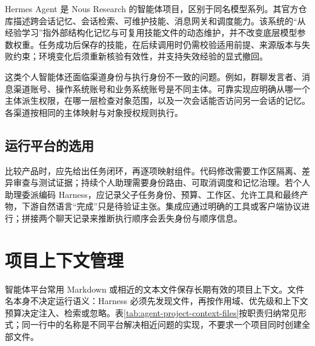 \documentclass[../textbook.tex]{subfiles}
\begin{document}
Hermes Agent 是 Nous Research 的智能体项目，区别于同名模型系列。其官方仓库描述跨会话记忆、会话检索、可维护技能、消息网关和调度能力\cite{nous2026hermesagent}。该系统的“从经验学习”指外部结构化记忆与可复用技能文件的动态维护，并不改变底层模型参数权重。任务成功后保存的技能，在后续调用时仍需校验适用前提、来源版本与失败约束；环境变化后须重新核验有效性，并支持失效经验的显式撤回。

这类个人智能体还面临渠道身份与执行身份不一致的问题。例如，群聊发言者、消息渠道账号、操作系统账号和业务系统账号是不同主体。可靠实现应明确从哪一个主体派生权限，在哪一层检查对象范围，以及一次会话能否访问另一会话的记忆。各渠道按相同的主体映射与对象授权规则执行。

\subsection{运行平台的选用}
比较产品时，应先给出任务闭环，再逐项映射组件。代码修改需要工作区隔离、差异审查与测试证据；持续个人助理需要身份路由、可取消调度和记忆治理。若个人助理委派编码 Harness，应记录父子任务身份、预算、工作区、允许工具和最终产物，下游自然语言“完成”只是待验证主张。集成应通过明确的工具或客户端协议进行；拼接两个聊天记录来推断执行顺序会丢失身份与顺序信息。

\section{项目上下文管理}

智能体平台常用 Markdown 或相近的文本文件保存长期有效的项目上下文。文件名本身不决定运行语义：Harness 必须先发现文件，再按作用域、优先级和上下文预算决定注入、检索或忽略。表\ref{tab:agent-project-context-files}按职责归纳常见形式；同一行中的名称是不同平台解决相近问题的实现，不要求一个项目同时创建全部文件。
\end{document}
